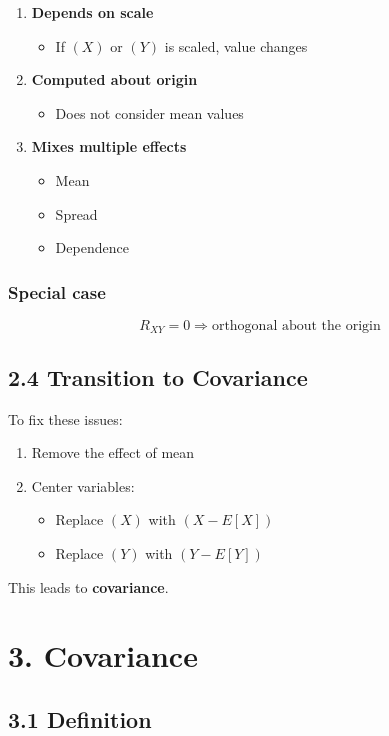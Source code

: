 \documentclass[12pt]{article}
\begin{document}
\begin{enumerate}
\item \textbf{Depends on scale}
\begin{itemize}
\item If $(X)$ or $(Y)$ is scaled, value changes
\end{itemize}
\item \textbf{Computed about origin}
\begin{itemize}
\item Does not consider mean values
\end{itemize}
\item \textbf{Mixes multiple effects}
\begin{itemize}
\item Mean
\item Spread
\item Dependence
\end{itemize}
\end{enumerate}

\subsubsection*{Special case}

\[
R_{XY} = 0
\Rightarrow \text{orthogonal about the origin}
\]

\subsection*{2.4 Transition to Covariance}

To fix these issues:

\begin{enumerate}
\item Remove the effect of mean
\item Center variables:
\begin{itemize}
\item Replace $(X)$ with $(X - E[X])$
\item Replace $(Y)$ with $(Y - E[Y])$
\end{itemize}
\end{enumerate}

This leads to \textbf{covariance}.

\section*{3. Covariance}

\subsection*{3.1 Definition}
\end{document}
